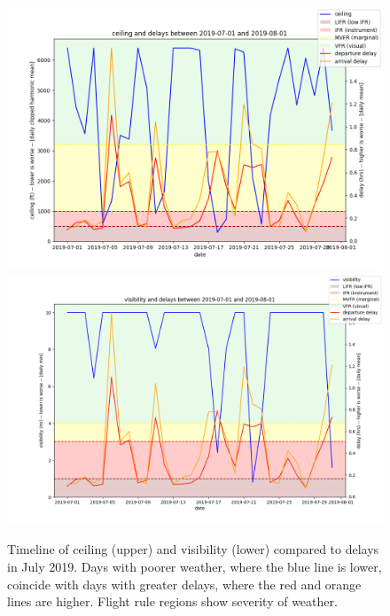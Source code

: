 \begin{figure}[htb!]
    \centering
    \includegraphics[width=.66\linewidth]{media/lga-analysis-1.png}
    \includegraphics[width=.66\linewidth]{media/lga-analysis-3.png}
    \caption{Timeline of ceiling (upper) and visibility (lower) compared to delays in July 2019. Days with poorer weather, where the blue line is lower, coincide with days with greater delays, where the red and orange lines are higher. Flight rule regions show severity of weather.}
    \label{fig:2019-07-weather-delay-timeline}
\end{figure}

